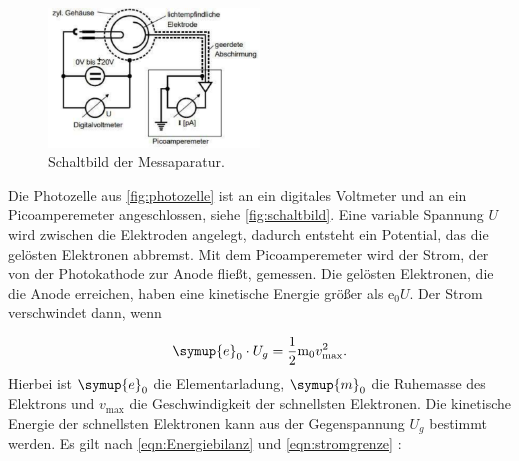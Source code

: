 \begin{figure}
    \centering
    \includegraphics[width =0.5\textwidth]{content/schaltbild.pdf}
    \caption{Schaltbild der Messaparatur.\cite{anleitung}}
    \label{fig:schaltbild}
\end{figure}
\noindent
Die Photozelle aus \autoref{fig:photozelle} ist an ein digitales Voltmeter und an ein Picoamperemeter angeschlossen, siehe \autoref{fig:schaltbild}.
Eine variable Spannung $U$ wird zwischen die Elektroden angelegt, dadurch entsteht ein Potential, das die gelösten Elektronen abbremst.
Mit dem Picoamperemeter wird der Strom, der von der Photokathode zur Anode fließt, gemessen.
Die gelösten Elektronen, die die Anode erreichen, haben eine kinetische Energie größer als $\text{e}_0 U$.
Der Strom verschwindet dann, wenn 

\begin{equation}
    \symup{e}_0 \cdot U_g = \frac{1}{2} \text{m}_0 v^2_\text{max}.
    \label{eqn:stromgrenze}
\end{equation}
\noindent
Hierbei ist $\symup{e}_0$ die Elementarladung, $\symup{m}_0$ die Ruhemasse des Elektrons und $v_\text{max}$ die Geschwindigkeit der schnellsten Elektronen.
Die kinetische Energie der schnellsten Elektronen kann aus der Gegenspannung $U_g$ bestimmt werden.
Es gilt nach \autoref{eqn:Energiebilanz} und \autoref{eqn:stromgrenze} :

